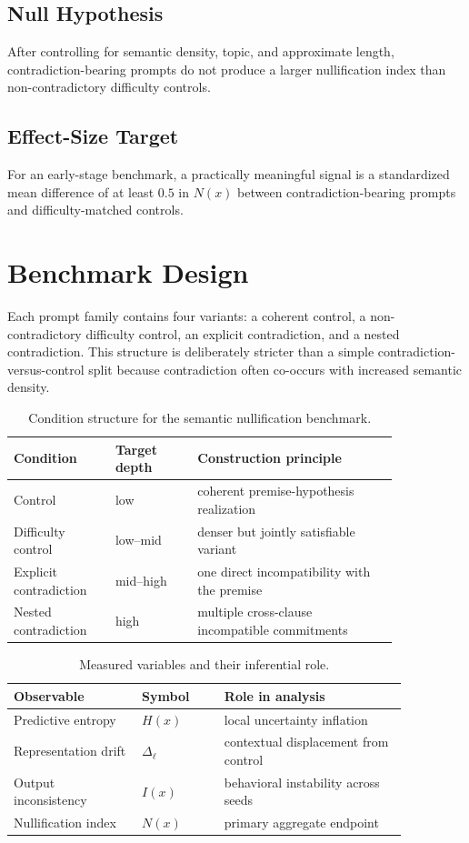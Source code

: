 \documentclass{svjour3}
\begin{document}
\subsection*{Null Hypothesis}
After controlling for semantic density, topic, and approximate length, contradiction-bearing prompts do not produce a larger nullification index than non-contradictory difficulty controls.

\subsection*{Effect-Size Target}
For an early-stage benchmark, a practically meaningful signal is a standardized mean difference of at least $0.5$ in $N(x)$ between contradiction-bearing prompts and difficulty-matched controls.

\section{Benchmark Design}
Each prompt family contains four variants: a coherent control, a non-contradictory difficulty control, an explicit contradiction, and a nested contradiction. This structure is deliberately stricter than a simple contradiction-versus-control split because contradiction often co-occurs with increased semantic density.

\begin{table}[t]
\centering
\small
\caption{Condition structure for the semantic nullification benchmark.}
\label{tab:hp-conditions}
\begin{tabular}{p{0.22\linewidth}p{0.18\linewidth}p{0.44\linewidth}}
\toprule
Condition & Target depth & Construction principle \\
\midrule
Control & low & coherent premise-hypothesis realization \\
Difficulty control & low--mid & denser but jointly satisfiable variant \\
Explicit contradiction & mid--high & one direct incompatibility with the premise \\
Nested contradiction & high & multiple cross-clause incompatible commitments \\
\bottomrule
\end{tabular}
\end{table}

\begin{table}[t]
\centering
\small
\caption{Measured variables and their inferential role.}
\label{tab:hp-variables}
\begin{tabular}{p{0.28\linewidth}p{0.18\linewidth}p{0.40\linewidth}}
\toprule
Observable & Symbol & Role in analysis \\
\midrule
Predictive entropy & $H(x)$ & local uncertainty inflation \\
Representation drift & $\Delta_\ell$ & contextual displacement from control \\
Output inconsistency & $I(x)$ & behavioral instability across seeds \\
Nullification index & $N(x)$ & primary aggregate endpoint \\
\bottomrule
\end{tabular}
\end{table}
\end{document}
